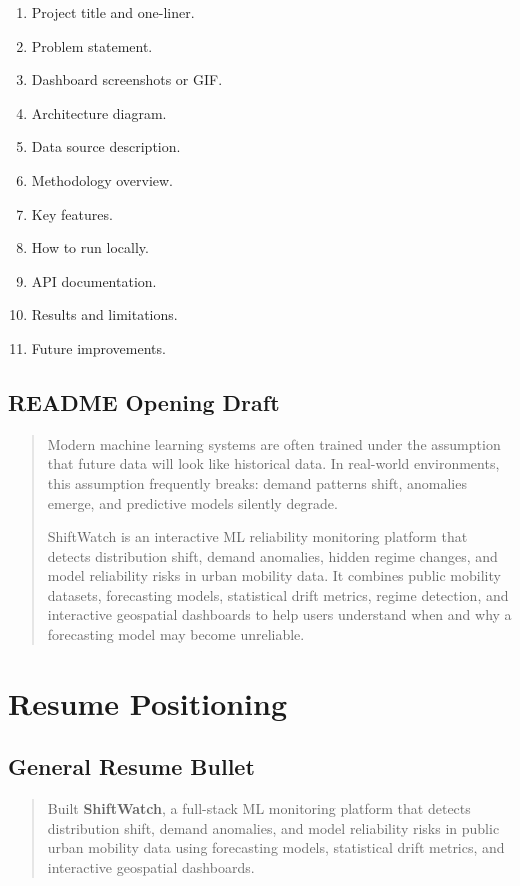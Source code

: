 \documentclass[11pt]{article}
\begin{document}
\begin{enumerate}
    \item Project title and one-liner.
    \item Problem statement.
    \item Dashboard screenshots or GIF.
    \item Architecture diagram.
    \item Data source description.
    \item Methodology overview.
    \item Key features.
    \item How to run locally.
    \item API documentation.
    \item Results and limitations.
    \item Future improvements.
\end{enumerate}

\subsection{README Opening Draft}

\begin{quote}
Modern machine learning systems are often trained under the assumption that future data will look like historical data. In real-world environments, this assumption frequently breaks: demand patterns shift, anomalies emerge, and predictive models silently degrade.

ShiftWatch is an interactive ML reliability monitoring platform that detects distribution shift, demand anomalies, hidden regime changes, and model reliability risks in urban mobility data. It combines public mobility datasets, forecasting models, statistical drift metrics, regime detection, and interactive geospatial dashboards to help users understand when and why a forecasting model may become unreliable.
\end{quote}

\section{Resume Positioning}

\subsection{General Resume Bullet}

\begin{quote}
Built \textbf{ShiftWatch}, a full-stack ML monitoring platform that detects distribution shift, demand anomalies, and model reliability risks in public urban mobility data using forecasting models, statistical drift metrics, and interactive geospatial dashboards.
\end{quote}
\end{document}
